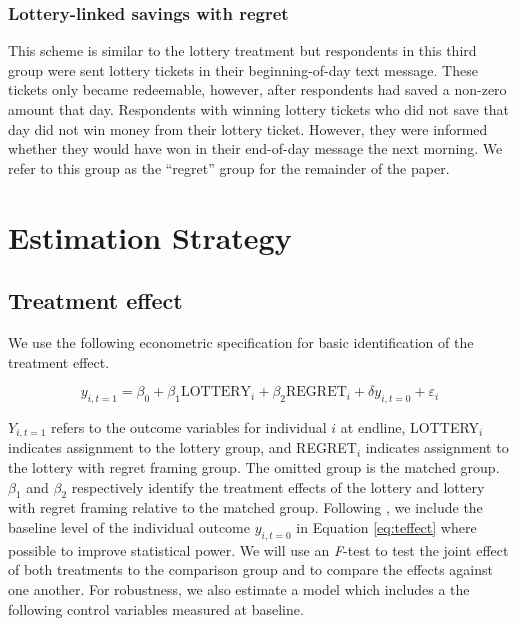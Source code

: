 \documentclass[10pt]{article}
\begin{document}
			\subsubsection{Lottery-linked savings with regret}

				This scheme is similar to the lottery treatment but respondents in this third group were sent lottery tickets in their beginning-of-day text message. These tickets only became redeemable, however, after respondents had saved a non-zero amount that day. Respondents with winning lottery tickets who did not save that day did not win money from their lottery ticket. However, they were informed whether they would have won in their end-of-day message the next morning. We refer to this group as the ``regret'' group for the remainder of the paper.

\section{Estimation Strategy} \label{sec:est}

	\subsection{Treatment effect}

		We use the following econometric specification for basic identification of the treatment effect.

		\begin{equation}
		y_{i,t=1} = \beta_{0} + \beta_{1}\text{LOTTERY}_{i} + \beta_{2}\text{REGRET}_{i} + \delta y_{i,t=0} + \varepsilon_{i}
		\label{eq:teffect} \end{equation}

		$Y_{i,t=1}$ refers to the outcome variables for individual $i$ at endline, LOTTERY$_i$ indicates assignment to the lottery group, and REGRET$_i$ indicates assignment to the lottery with regret framing group. The omitted group is the matched group. $\beta_{1}$ and $\beta_{2}$ respectively identify the treatment effects of the lottery and lottery with regret framing relative to the matched group. Following , we include the baseline level of the individual outcome $y_{i,t=0}$ in Equation \ref{eq:teffect} where possible to improve statistical power. We will use an \emph{F}-test to test the joint effect of both treatments to the comparison group and to compare the effects against one another. For robustness, we also estimate a model which includes a the following control variables measured at baseline.
\end{document}
